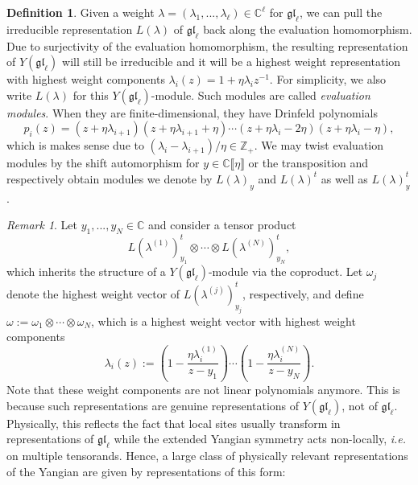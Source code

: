 \documentclass[11pt]{report}
\theoremstyle{definition}
\newtheorem{definition}[theorem]{Definition}
\theoremstyle{remark}
\newtheorem*{remark}{Remark}
\theoremstyle{remark}
\newcommand{\Z}{\mathbb{Z}}
\newcommand{\C}{\mathbb{C}}
\begin{document}
\begin{definition}
Given a weight $\lambda = (\lambda_1,...,\lambda_\ell) \in \C^\ell$ for $\mathfrak{gl}_\ell$, we can pull the irreducible representation $L(\lambda)$ of $\mathfrak{gl}_\ell$ back along the evaluation homomorphism. Due to surjectivity of the evaluation homomorphism, the resulting representation of $Y(\mathfrak{gl}_\ell)$ will still be irreducible and it will be a highest weight representation with highest weight components $\lambda_i(z) = 1 + \eta \lambda_i z^{-1}$. For simplicity, we also write $L(\lambda)$ for this $Y(\mathfrak{gl}_\ell)$-module. Such modules are called \emph{evaluation modules}. When they are finite-dimensional, they have Drinfeld polynomials
\begin{equation*}
p_i(z) = (z+\eta \lambda_{i+1})(z+\eta \lambda_{i+1}+\eta) \cdots (z+\eta \lambda_i-2\eta)(z+\eta \lambda_i-\eta),
\end{equation*}
which is makes sense due to $(\lambda_i - \lambda_{i+1})/\eta \in \Z_+$. We may twist evaluation modules by the shift automorphism for $y \in \C\llbracket \eta \rrbracket$ or the transposition and respectively obtain modules we denote by $L(\lambda)_y$ and $L(\lambda)^t$ as well as $L(\lambda)_y^t$.
\end{definition}

\begin{remark}
Let $y_1,...,y_N \in \C$ and consider a tensor product
\begin{equation*}
L(\lambda^{(1)})_{y_1}^t \otimes \cdots \otimes L(\lambda^{(N)})_{y_N}^t,
\end{equation*}
which inherits the structure of a $Y(\mathfrak{gl}_\ell)$-module via the coproduct. Let $\omega_j$ denote the highest weight vector of $L(\lambda^{(j)})_{y_j}^t$, respectively, and define $\omega := \omega_1 \otimes \cdots \otimes \omega_N$, which is a highest weight vector with highest weight components
\begin{equation*}
\lambda_i(z) := \left( 1 - \frac{\eta \lambda_i^{(1)}}{z-y_1} \right) \cdots \left( 1 - \frac{\eta \lambda_i^{(N)}}{z-y_N} \right).
\end{equation*}
Note that these weight components are not linear polynomials anymore. This is because such representations are genuine representations of $Y(\mathfrak{gl}_\ell)$, not of $\mathfrak{gl}_\ell$. Physically, this reflects the fact that local sites usually transform in representations of $\mathfrak{gl}_\ell$ while the extended Yangian symmetry acts non-locally, \emph{i.e.} on multiple tensorands. Hence, a large class of physically relevant representations of the Yangian are given by representations of this form:
\end{remark}
\end{document}
